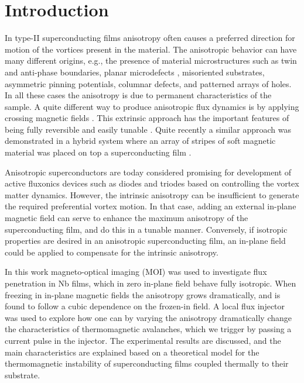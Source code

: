 \documentclass[superscriptaddress,twocolumn,aps,
showpacs]{revtex4-1}
\begin{document}
\maketitle
\section{Introduction}

In type-II superconducting films anisotropy often causes a preferred direction for motion of the vortices present in the material\cite{berghuis_intrinsic_1997, dobrovolskiy17}.
The anisotropic behavior can have many different origins, e.g., the presence of material microstructures such as twin and anti-phase boundaries\cite{turchinskaya_direct_1993, jooss_pinning_2000}, planar microdefects \cite{cuche_influence_1996}, misoriented substrates\cite{polyanskii_magneto-optical_2005, qviller_quasi-one-dimensional_2012}, asymmetric pinning potentials\cite{he_magneto-optical_2009},  columnar defects\cite{schuster_critical-current_1995, leonhardt_influence_2000}, and patterned arrays of holes\cite{tsuchiya_anisotropic_2014}.
In all these cases the anisotropy is  due to permanent characteristics of the sample.
A quite different way to produce anisotropic flux dynamics is by applying crossing magnetic fields \cite{indenbom_anisotropy_1994}.
This extrinsic approach has the important features of being fully reversible and easily tunable \cite{schuster_discontinuity_1995, vlasko-vlasov_crossing_2016}.
Quite recently a similar approach was demonstrated  in a hybrid system where an array of stripes of soft magnetic material was placed on top a superconducting film \cite{vlasko-vlasov_manipulating_2017}.

Anisotropic superconductors are today considered promising for development of active fluxonics devices such as diodes \cite{de_souza_silva_dipole-induced_2007} and triodes \cite{vlasko-vlasov_triode_2016} based on controlling the vortex matter dynamics\cite{crete_devices_2002}.
However, the intrinsic anisotropy can be insufficient to generate the required preferential vortex motion. In that case, adding an external in-plane magnetic field can serve to enhance the maximum anisotropy of the superconducting film, and do this in a tunable manner.
Conversely, if isotropic properties are desired in an anisotropic superconducting film, an in-plane field could be applied to compensate for the intrinsic anisotropy.

In this work magneto-optical imaging (MOI) was used to investigate flux penetration in Nb films, which in zero in-plane field behave fully isotropic. 
When freezing in  in-plane magnetic fields  the anisotropy grows dramatically, and is found to  follow a cubic dependence on the frozen-in field. 
A local flux injector was used to explore how one can by varying the  anisotropy dramatically change the characteristics of thermomagnetic avalanches, which we 
trigger by passing a current pulse in the injector.
The experimental results are discussed, and the main characteristics are explained based on a theoretical model for the thermomagnetic instability of  superconducting films coupled thermally to their substrate.
\end{document}
